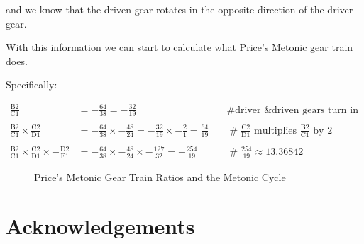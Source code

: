\documentclass[11pt, oneside]{article}   	%
\theoremstyle{definition}
\begin{document}
\bigskip
\noindent
and we know that the driven gear rotates in the opposite direction of the driver gear. 


\bigskip
\noindent
With this information we can start to calculate what Price's Metonic gear train does. 

\bigskip
\noindent
Specifically:

\begin{equation*}
\begin{array}{lllll}
\frac{\text{B2}}{\text{C1}} &= - \frac{64}{38} = - \frac{32}{19} & \quad \mathrel{\#} \text{driver \& driven gears turn in opposite directions} \\ \\
\frac{\text{B2}}{\text{C1}} \times \frac{\text{C2}}{\text{D1}} &= - \frac{64}{38} \times - \frac{48}{24} = - \frac{32}{19} \times - \frac{2}{1} = \frac{64}{19} 
& \quad \mathrel{\#} \frac{\text{C2}}{\text{D1}} \text{ multiplies $\frac{\text{B2}}{\text{C1}}$ by $2$}                       \\ \\
\frac{\text{B2}}{\text{C1}} \times \frac{\text{C2}}{\text{D1}} \times - \frac{\text{D2}}{\text{E1}} &= - \frac{64}{38} \times - \frac{48}{24} \times - \frac{127}{32} 
=  -\frac{254}{19} & \quad \mathrel{\#} \frac{254}{19} \approx 13.36842
\end{array}
\end{equation*}

\bigskip
\bigskip
\begin{figure}[H]
\caption{Price's Metonic Gear Train Ratios and the Metonic Cycle}
\label{fig:metonic_gear_ratios}
\end{figure}

\bigskip
\section{Acknowledgements}

\newpage


\end{document}
